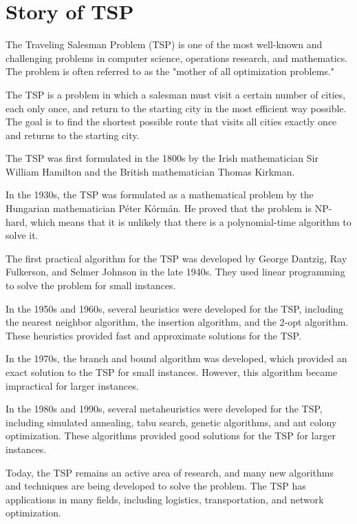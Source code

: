 \section{Story of TSP}
The Traveling Salesman Problem (TSP) is one of the most well-known and challenging problems in computer science, operations research, and mathematics. The problem is often referred to as the "mother of all optimization problems."

The TSP is a problem in which a salesman must visit a certain number of cities, each only once, and return to the starting city in the most efficient way possible. The goal is to find the shortest possible route that visits all cities exactly once and returns to the starting city.

The TSP was first formulated in the 1800s by the Irish mathematician Sir William Hamilton and the British mathematician Thomas Kirkman. 

In the 1930s, the TSP was formulated as a mathematical problem by the Hungarian mathematician Péter Kórmán. He proved that the problem is NP-hard, which means that it is unlikely that there is a polynomial-time algorithm to solve it.

The first practical algorithm for the TSP was developed by George Dantzig, Ray Fulkerson, and Selmer Johnson in the late 1940s. They used linear programming to solve the problem for small instances.

In the 1950s and 1960s, several heuristics were developed for the TSP, including the nearest neighbor algorithm, the insertion algorithm, and the 2-opt algorithm. These heuristics provided fast and approximate solutions for the TSP.

In the 1970s, the branch and bound algorithm was developed, which provided an exact solution to the TSP for small instances. However, this algorithm became impractical for larger instances.

In the 1980s and 1990s, several metaheuristics were developed for the TSP, including simulated annealing, tabu search, genetic algorithms, and ant colony optimization. These algorithms provided good solutions for the TSP for larger instances.

Today, the TSP remains an active area of research, and many new algorithms and techniques are being developed to solve the problem. The TSP has applications in many fields, including logistics, transportation, and network optimization.
